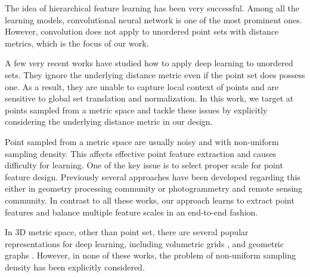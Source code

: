 The idea of hierarchical feature learning has been very successful. Among all the learning models, convolutional neural network \cite{krizhevsky2012imagenet,simonyan2014very,he2016deep} is one of the most prominent ones.
However, convolution does not apply to unordered point sets with distance metrics, which is the focus of our work.

A few very recent works \cite{qi2016pointnet,vinyals2015order} have studied how to apply deep learning to unordered sets. They ignore the underlying distance metric even if the point set does possess one. As a result, they are unable to capture local context of points and are sensitive to global set translation and normalization. In this work, we target at points sampled from a metric space and tackle these issues by explicitly considering the underlying distance metric in our design.

Point sampled from a metric space are usually noisy and with non-uniform sampling density. This affects effective point feature extraction and causes difficulty for learning. One of the key issue is to select proper scale for point feature design. Previously several approaches have been developed regarding this \cite{pauly2006point, mitra2004estimating, belton2006classification,demantke2011dimensionality, gressin2013towards,weinmann2015semantic} either in geometry processing community or photogrammetry and remote sensing community.
In contrast to all these works, our approach learns to extract point features and balance multiple feature scales in an end-to-end fashion.

In 3D metric space, other than point set, there are several popular representations for deep learning, including volumetric grids \cite{qi2016volumetric,riegler2016octnet,wang2017cnn}, and geometric graphs \cite{bruna2013spectral,masci2015geodesic,yi2016syncspeccnn}. %
However, in none of these works, the problem of non-uniform sampling density has been explicitly considered.%

